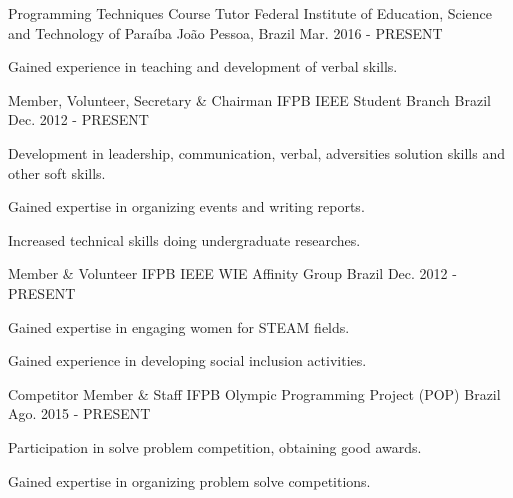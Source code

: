 

\begin{cventries}

  \cventry
    {Programming Techniques Course Tutor} %
    {Federal Institute of Education, Science and Technology of Paraíba} %
    {João Pessoa, Brazil} %
    {Mar. 2016 - PRESENT} %
    {
      \begin{cvitems} %
        \item {Gained experience in teaching and development of verbal skills.}
      \end{cvitems}
    }
    
  \cventry
    {Member, Volunteer, Secretary \& Chairman} %
    {IFPB IEEE Student Branch} %
    {Brazil} %
    {Dec. 2012 - PRESENT} %
    {
      \begin{cvitems} %
		\item{Development in leadership, communication, verbal, adversities solution skills and other soft skills.}
		\item{Gained expertise in organizing events and writing reports.}
		\item{Increased technical skills doing undergraduate researches.}
      \end{cvitems}
    }

  \cventry
    {Member \& Volunteer} %
    {IFPB IEEE WIE Affinity Group} %
    {Brazil} %
    {Dec. 2012 - PRESENT} %
    {
      \begin{cvitems} %
		\item{Gained expertise in engaging women for STEAM fields.}
		\item{Gained experience in developing social inclusion activities.}
      \end{cvitems}
    }
  \cventry
    {Competitor Member \& Staff} %
    {IFPB Olympic Programming Project (POP)} %
    {Brazil} %
    {Ago. 2015 - PRESENT} %
    {
      \begin{cvitems} %
        \item {Participation in solve problem competition, obtaining good awards.}
        \item {Gained expertise in organizing problem solve competitions.}
      \end{cvitems}
    }


\end{cventries}
